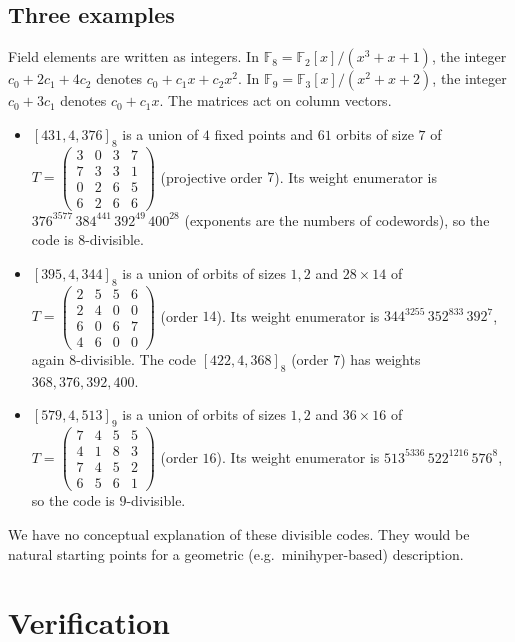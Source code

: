 \documentclass[11pt]{article}
\numberwithin{equation}{section}
\theoremstyle{definition}
\theoremstyle{remark}
\newcommand{\F}{\mathbb F}
\begin{document}
{\small
\setlength{\tabcolsep}{4pt}

}

\subsection{Three examples}
Field elements are written as integers. In $\F_8=\F_2[x]/(x^3+x+1)$, the integer $c_0+2c_1+4c_2$
denotes $c_0+c_1x+c_2x^2$. In $\F_9=\F_3[x]/(x^2+x+2)$, the integer $c_0+3c_1$ denotes $c_0+c_1x$.
The matrices act on column vectors.

\begin{itemize}
\item $[431,4,376]_8$ is a union of $4$ fixed points and $61$ orbits of size $7$ of
$T=\left(\begin{smallmatrix}3&0&3&7\\7&3&3&1\\0&2&6&5\\6&2&6&6\end{smallmatrix}\right)$ (projective order
$7$). Its weight enumerator is $376^{3577}\,384^{441}\,392^{49}\,400^{28}$ (exponents are the numbers
of codewords), so the code is $8$-divisible.
\item $[395,4,344]_8$ is a union of orbits of sizes $1,2$ and $28\times14$ of
$T=\left(\begin{smallmatrix}2&5&5&6\\2&4&0&0\\6&0&6&7\\4&6&0&0\end{smallmatrix}\right)$ (order $14$). Its
weight enumerator is $344^{3255}\,352^{833}\,392^{7}$, again $8$-divisible.
The code $[422,4,368]_8$ (order $7$) has weights $368,376,392,400$.
\item $[579,4,513]_9$ is a union of orbits of sizes $1,2$ and $36\times 16$ of
$T=\left(\begin{smallmatrix}7&4&5&5\\4&1&8&3\\7&4&5&2\\6&5&6&1\end{smallmatrix}\right)$ (order $16$). Its
weight enumerator is $513^{5336}\,522^{1216}\,576^{8}$, so the code is $9$-divisible.
\end{itemize}
We have no conceptual explanation of these divisible codes. They would be natural starting points for
a geometric (e.g.\ minihyper-based) description.

\section{Verification}\label{sec:lean}
\end{document}
